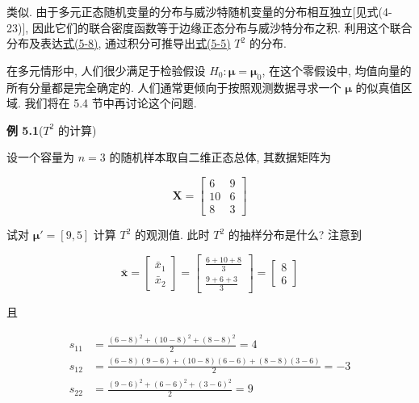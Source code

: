 类似. 由于多元正态随机变量的分布与威沙特随机变量的分布相互独立[见式(4-23)], 因此它们的联合密度函数等于边缘正态分布与威沙特分布之积. 利用这个联合分布及表达\hyperref[eq:5-8]{式(5-8)}, 通过积分可推导出\hyperref[eq:5-5]{式(5-5)} $T^2$ 的分布.

在多元情形中, 人们很少满足于检验假设 $H_0: \boldsymbol{\mu}=\boldsymbol{\mu}_0$, 在这个零假设中, 均值向量的所有分量都是完全确定的. 人们通常更倾向于按照观测数据寻求一个 $\boldsymbol{\mu}$ 的似真值区域. 我们将在 5.4 节中再讨论这个问题.

\noindent\textbf{例 5.1}\quad ($T^2$ 的计算)

设一个容量为 $n=3$ 的随机样本取自二维正态总体, 其数据矩阵为

\[
\mathbf{X}=\begin{bmatrix}6&9\\10&6\\8&3\end{bmatrix}
\]

试对 $\boldsymbol{\mu}'=[9,5]$ 计算 $T^2$ 的观测值. 此时 $T^2$ 的抽样分布是什么? 注意到

\[
\bar{\mathbf{x}}=\begin{bmatrix}\bar{x}_1\\ \bar{x}_2\end{bmatrix}=\begin{bmatrix}\frac{6+10+8}{3}\\ \frac{9+6+3}{3}\end{bmatrix}=\begin{bmatrix}8\\6\end{bmatrix}
\]

且

\begin{align*}
s_{11}&=\frac{(6-8)^2+(10-8)^2+(8-8)^2}{2}=4\\
s_{12}&=\frac{(6-8)(9-6)+(10-8)(6-6)+(8-8)(3-6)}{2}=-3\\
s_{22}&=\frac{(9-6)^2+(6-6)^2+(3-6)^2}{2}=9
\end{align*}
